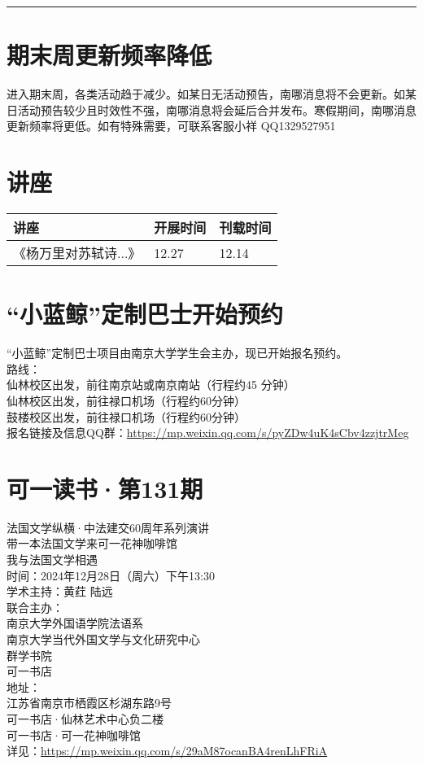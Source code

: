 \documentclass[letterpaper, 12pt]{article}
\begin{document}
\hrule
\pagebreak
\begin{multicols}{2}
\section{期末周更新频率降低}
进入期末周，各类活动趋于减少。如某日无活动预告，南哪消息将不会更新。如某日活动预告较少且时效性不强，南哪消息将会延后合并发布。寒假期间，南哪消息更新频率将更低。如有特殊需要，可联系客服小祥 QQ1329527951
\section{讲座}
\begin{tabularx}{0.5\textwidth}{|X|X|X|}
    \hline
    讲座 & 开展时间 & 刊载时间\\
    \hline\hline
《杨万里对苏轼诗...》 & 12.27 & 12.14\\\hline

\end{tabularx}




\section{“小蓝鲸”定制巴士开始预约}
“小蓝鲸”定制巴士项目由南京大学学生会主办，现已开始报名预约。\\
路线：\\
仙林校区出发，前往南京站或南京南站（行程约45 分钟）\\
仙林校区出发，前往禄口机场（行程约60分钟）\\
鼓楼校区出发，前往禄口机场（行程约60分钟）\\
报名链接及信息QQ群：\url{https://mp.weixin.qq.com/s/pyZDw4uK4sCbv4zzjtrMeg}\\
\section{可一读书·第131期}
法国文学纵横·中法建交60周年系列演讲\\
带一本法国文学来可一花神咖啡馆\\
我与法国文学相遇\\
时间：2024年12月28日（周六）下午13:30\\
学术主持：黄荭 陆远\\
联合主办：\\
南京大学外国语学院法语系\\
南京大学当代外国文学与文化研究中心\\
群学书院\\
可一书店\\
地址：\\
江苏省南京市栖霞区杉湖东路9号\\
可一书店·仙林艺术中心负二楼\\
可一书店·可一花神咖啡馆\\
详见：\url{https://mp.weixin.qq.com/s/29aM87ocanBA4renLhFRiA}

\end{multicols}
\end{document}
